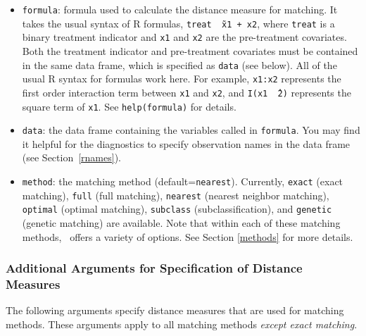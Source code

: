 \begin{itemize}

\item \texttt{formula}: formula used to calculate the distance measure
  for matching.  It takes the usual syntax of R formulas, {\tt treat
    \~\ x1 + x2}, where {\tt treat} is a binary treatment indicator
  and {\tt x1} and {\tt x2} are the pre-treatment covariates. Both the
  treatment indicator and pre-treatment covariates must be contained
  in the same data frame, which is specified as {\tt data} (see
  below).  All of the usual R syntax for formulas work here. For
  example, {\tt x1:x2} represents the first order interaction term
  between {\tt x1} and {\tt x2}, and {\tt I(x1 \^\ 2)} represents the
  square term of {\tt x1}. See {\tt help(formula)} for details.
  
\item \texttt{data}: the data frame containing the variables called in
  {\tt formula}.  You may find it helpful for the diagnostics to
  specify observation names in the data frame (see
  Section~\ref{rnames}).
  
\item \texttt{method}: the matching method (default=\texttt{nearest}).
  Currently, \texttt{exact} (exact matching), \texttt{full} (full
  matching), \texttt{nearest} (nearest neighbor matching),
  \texttt{optimal} (optimal matching), \texttt{subclass}
  (subclassification), and \texttt{genetic} (genetic matching) are
  available. Note that within each of these matching methods,
  \MatchIt\ offers a variety of options.  See Section \ref{methods}
  for more details.
  
\end{itemize}


\subsubsection{Additional Arguments for Specification of
  Distance Measures}
\label{subsubsec:inputs-all}

The following arguments specify distance measures that are used for
matching methods. These arguments apply to all matching methods {\it
  except exact matching}.

